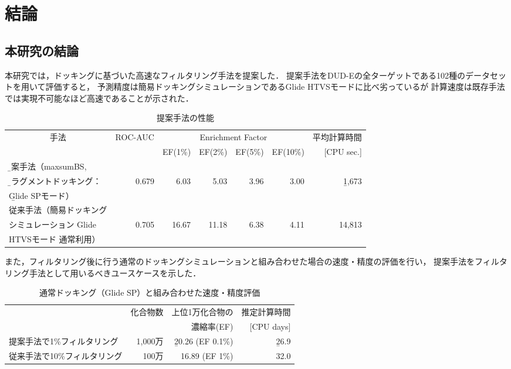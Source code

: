 \chapter{結論}
\section{本研究の結論}\label{sec:conclusion}
本研究では，ドッキングに基づいた高速なフィルタリング手法を提案した．
提案手法をDUD-Eの全ターゲットである102種のデータセットを用いて評価すると，
予測精度は簡易ドッキングシミュレーションであるGlide HTVSモードに比べ劣っているが
計算速度は既存手法では実現不可能なほど高速であることが示された．
\begin{table}[h] \centering
	\caption{提案手法の性能}
	\label{table:conclusion_1}
	\begin{tabular}{l|rrrrrr}
	\hline
	\multicolumn{1}{c|}{\multirow{2}{*}{手法}}	&\multirow{2}{*}{ROC-AUC}	&\multicolumn{4}{c}{Enrichment Factor}	&平均計算時間	\\
										&						&EF(1\%)	&EF(2\%)	&EF(5\%)	&EF(10\%)	&[CPU sec.]		\\ \hline
	\b{提案手法（maxsumBS, }	&&&&&& \\
	\b{フラグメントドッキング：}				&0.679					&6.03	&5.03	&3.96	&3.00		&\b{1,673}		\\
	\b{Glide SPモード）}			&&&&&& \\ \hline
	従来手法（簡易ドッキング	&&&&&& \\
	シミュレーション	Glide 		&0.705&16.67&11.18&6.38&4.11&14,813 \\ 
	HTVSモード 通常利用）		&&&&&& \\
	\hline
	\end{tabular}
\end{table}

また，フィルタリング後に行う通常のドッキングシミュレーションと組み合わせた場合の速度・精度の評価を行い，
提案手法をフィルタリング手法として用いるべきユースケースを示した．
\begin{table}[b] \centering
	\caption{通常ドッキング（Glide SP）と組み合わせた速度・精度評価}
	\label{table:conclusion_2}
	\begin{tabular}{l|rrr}
	\hline
												&\multirow{2}{*}{化合物数}	&上位1万化合物の		&推定計算時間	\\
												&														&濃縮率(EF)				&[CPU days]		\\ \hline
	提案手法で1\%フィルタリング		&1,000万											&\b{20.26 (EF 0.1\%)}		&\b{26.9}				\\
	従来手法で10\%フィルタリング	&100万												&16.89 (EF 1\%)			&32.0				\\ \hline
	\end{tabular}
	\vspace{-0.5cm}
\end{table}

